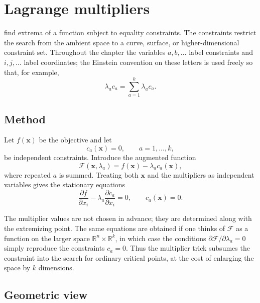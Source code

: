 \section{Lagrange multipliers}

 find extrema of a function subject to equality constraints. The constraints restrict the search from the ambient space to a curve, surface, or higher-dimensional constraint set. Throughout the chapter the variables $a,b,\ldots$ label constraints and $i,j,\ldots$ label coordinates; the Einstein convention on these letters is used freely so that, for example,
\begin{equation}
\lambda_a c_a=\sum_{a=1}^{k}\lambda_a c_a.
\end{equation}

\subsection{Method}

Let $f(\mathbf{x})$ be the objective and let
\begin{equation}
c_a(\mathbf{x})=0,
\qquad a=1,\ldots,k,
\end{equation}
be independent constraints. Introduce the augmented function
\begin{equation}
\mathcal{F}(\mathbf{x},\lambda_a)=f(\mathbf{x})-\lambda_a c_a(\mathbf{x}),
\end{equation}
where repeated $a$ is summed. Treating both $\mathbf{x}$ and the multipliers as independent variables gives the stationary equations
\begin{equation}
\frac{\partial f}{\partial x_i}
-\lambda_a\frac{\partial c_a}{\partial x_i}=0,
\qquad
c_a(\mathbf{x})=0.
\end{equation}

The multiplier values are not chosen in advance; they are determined along with the extremizing point. The same equations are obtained if one thinks of $\mathcal{F}$ as a function on the larger space $\mathbb{R}^n\times\mathbb{R}^k$, in which case the conditions $\partial\mathcal{F}/\partial \lambda_a=0$ simply reproduce the constraints $c_a=0$. Thus the multiplier trick subsumes the constraint into the search for ordinary critical points, at the cost of enlarging the space by $k$ dimensions.

\subsection{Geometric view}

